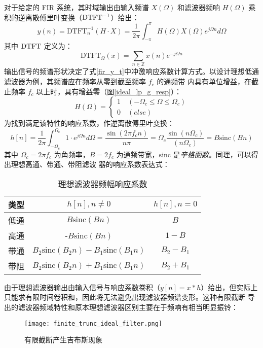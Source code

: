 对于给定的 FIR 系统，其时域输出由输入频谱 $X(\Omega)$ 和滤波器频响 $H(\Omega)$ 乘积的逆离散傅里叶变换（$\rm{DTFT^{-1}}$）给出：
\begin{equation}
    \label{fir_y_t}
    y(n)=\textrm{DTFT}^{-1}_n(H\cdot X)=\frac{1}{2\pi}\int_{-\pi}^{\pi}H(\Omega)X(\Omega)e^{j\Omega n}d\Omega
\end{equation}
其中 $\rm{DTFT}$ 定义为：
$$
    \textrm{DTFT}_{\Omega}(x)=\sum_{n\in \mathbb{Z}}x(n)e^{-j\Omega n}
$$
输出信号的频谱形状决定了式\eqref{fir_y_t}中冲激响应系数计算方式。以设计理想低通滤波器为例，其频谱应在频率从零到截至频率 $f_c$ 的通频带
内具有单位增益，在截止频率 $f_c$ 以上时，具有增益零（图\ref{ideal_lp_g_resp}）：
\begin{equation*}
    H(\Omega)=\begin{cases} 1\quad(-\Omega_c\le\Omega\le \Omega_c)\\ 0\quad(else) \end{cases}
\end{equation*}
为找到满足该特性的响应系数，作逆离散傅里叶变换：
\begin{equation}
    h[n]=\frac{1}{2\pi}\int_{-\Omega_c}^{\Omega_c}{1\cdot e^{j\Omega n}d\Omega}
    =\frac{\sin(2\pi f_c n)}{n \pi}
    =\Omega_c \frac{\sin \left(n \Omega_{c}\right)}{\left(n \Omega_{c}\right)}
    =B \textrm{sinc}(Bn)
\end{equation}
其中 $\Omega_c=2\pi f_c$ 为角频率，$B = 2f_c$ 为通频带宽，$\textrm{sinc}$ 是\emph{辛格函数}。同理，可以得出理想高通、带通、带阻滤波
器的响应系数表达式：
\begin{table}[!h]
    \caption{理想滤波器频幅响应系数}
    \centering
    \begin{tabular}{ccc}
        \hline
        类型 & $h[n],n\ne0$                                    & $h[n],n=0$ \\ \hline
        低通 & $B\mathrm{sinc}(Bn)$                            & $B$        \\
        高通 & -$B\mathrm{sinc}(Bn)$                           & $1-B$      \\
        带通 & $B_2\mathrm{sinc}(B_2n)-B_1\mathrm{sinc}(B_1n)$ & $B_2-B_1$  \\
        带阻 & $B_2\mathrm{sinc}(B_2n)+B_1\mathrm{sinc}(B_1n)$ & $B_2+B_1$  \\ \hline
    \end{tabular}
\end{table}

由于理想滤波器输出由输入信号与响应系数卷积（$y[n]=x * h$）给出，但实际上只能求有限时间卷积和，因此将无法避免出现滤波器频谱变形。这种有限截断
导出的滤波器频域特性和原本理想滤波器区别主要在于频响有相当明显振铃：
\begin{figure}[htbp]
    \centering\label{finite_trunc_ideal_filter}
    \texttt{[image: finite\_trunc\_ideal\_filter.png]}
    \caption{有限截断产生吉布斯现象}
\end{figure}

